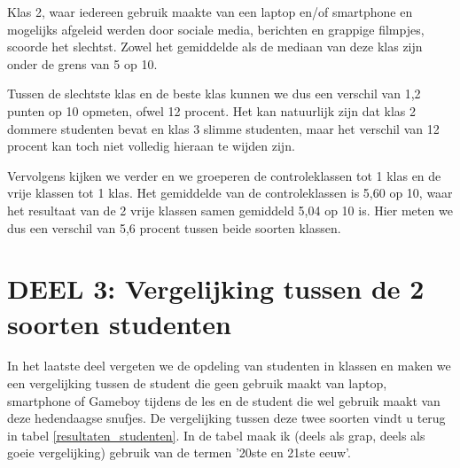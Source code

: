 Klas 2, waar iedereen gebruik maakte van een laptop en/of smartphone en mogelijks afgeleid werden door sociale media, berichten en grappige filmpjes, scoorde het slechtst. Zowel het gemiddelde als de mediaan van deze klas zijn onder de grens van 5 op 10.

Tussen de slechtste klas en de beste klas kunnen we dus een verschil van 1,2 punten op 10 opmeten, ofwel 12 procent. Het kan natuurlijk zijn dat klas 2 dommere studenten bevat en klas 3 slimme studenten, maar het verschil van 12 procent kan toch niet volledig hieraan te wijden zijn.

Vervolgens kijken we verder en we groeperen de controleklassen tot 1 klas en de vrije klassen tot 1 klas. Het gemiddelde van de controleklassen is 5,60 op 10, waar het resultaat van de 2 vrije klassen samen gemiddeld 5,04 op 10 is. Hier meten we dus een verschil van 5,6 procent tussen beide soorten klassen.


\section{DEEL 3: Vergelijking tussen de 2 soorten studenten}
\label{sec:vragen_res3}

In het laatste deel vergeten we de opdeling van studenten in klassen en maken we een vergelijking tussen de student die geen gebruik maakt van laptop, smartphone of Gameboy tijdens de les en de student die wel gebruik maakt van deze hedendaagse snufjes. De vergelijking tussen deze twee soorten vindt u terug in tabel \ref{resultaten_studenten}. In de tabel maak ik (deels als grap, deels als goeie vergelijking) gebruik van de termen '20ste en 21ste eeuw'.

